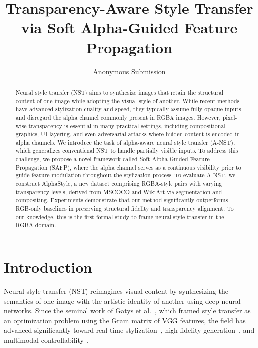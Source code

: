 \documentclass[letterpaper]{article} %
\title{Transparency-Aware Style Transfer via Soft Alpha-Guided Feature Propagation}
\author{
    Anonymous Submission
}
\begin{document}
\maketitle

\begin{abstract}
Neural style transfer (NST) aims to synthesize images that retain the structural content of one image while adopting the visual style of another. While recent methods have advanced stylization quality and speed, they typically assume fully opaque inputs and disregard the alpha channel commonly present in RGBA images. However, pixel-wise transparency is essential in many practical settings, including compositional graphics, UI layering, and even adversarial attacks where hidden content is encoded in alpha channels.
We introduce the task of alpha-aware neural style transfer (A-NST), which generalizes conventional NST to handle partially visible inputs. To address this challenge, we propose a novel framework called Soft Alpha-Guided Feature Propagation (SAFP), where the alpha channel serves as a continuous visibility prior to guide feature modulation throughout the stylization process. 
To evaluate A-NST, we construct AlphaStyle, a new dataset comprising RGBA-style pairs with varying transparency levels, derived from MSCOCO and WikiArt via segmentation and compositing. Experiments demonstrate that our method significantly outperforms RGB-only baselines in preserving structural fidelity and transparency alignment. To our knowledge, this is the first formal study to frame neural style transfer in the RGBA domain.
\end{abstract}


\section{Introduction}

Neural style transfer (NST) reimagines visual content by synthesizing the semantics of one image with the artistic identity of another using deep neural networks. 
Since the seminal work of Gatys et al.~\cite{gatys2016image}, which framed style transfer as an optimization problem using the Gram matrix of VGG features, the field has advanced significantly toward real-time stylization~\cite{huang2017arbitrary}, high-fidelity generation~\cite{kwon2024aesfa}, and multimodal controllability~\cite{ahn2024dreamstyler}.
\end{document}
